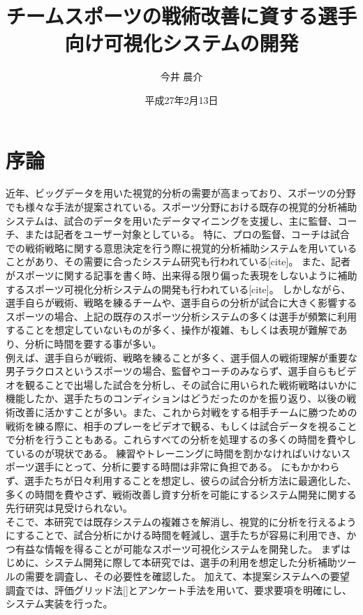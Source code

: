 \documentclass[sotsuron]{kuee}
\title{チームスポーツの戦術改善に資する選手向け可視化システムの開発}
\author{今井 晨介}
\date{平成27年2月13日}
\begin{document}
\maketitle	
\tableofcontents


\chapter{序論}
	近年、ビッグデータを用いた視覚的分析の需要が高まっており、スポーツの分野でも様々な手法が提案されている。スポーツ分野における既存の視覚的分析補助システムは、試合のデータを用いたデータマイニングを支援し、主に監督、コーチ、または記者をユーザー対象としている。
	特に、プロの監督、コーチは試合での戦術戦略に関する意思決定を行う際に視覚的分析補助システムを用いていることがあり、その需要に合ったシステム研究も行われている[cite]。
	また、記者がスポーツに関する記事を書く時、出来得る限り偏った表現をしないように補助するスポーツ可視化分析システムの開発も行われている[cite]。
	しかしながら、選手自らが戦術、戦略を練るチームや、選手自らの分析が試合に大きく影響するスポーツの場合、上記の既存のスポーツ分析システムの多くは選手が頻繁に利用することを想定していないものが多く、操作が複雑、もしくは表現が難解であり、分析に時間を要する事が多い。
	\\例えば、選手自らが戦術、戦略を練ることが多く、選手個人の戦術理解が重要な男子ラクロスというスポーツの場合、監督やコーチのみならず、選手自らもビデオを観ることで出場した試合を分析し、その試合に用いられた戦術戦略はいかに機能したか、選手たちのコンディションはどうだったのかを振り返り、以後の戦術改善に活かすことが多い。また、これから対戦をする相手チームに勝つための戦術を練る際に、相手のプレーをビデオで観る、もしくは試合データを視ることで分析を行うこともある。これらすべての分析を処理するの多くの時間を費やしているのが現状である。
	練習やトレーニングに時間を割かなければいけないスポーツ選手にとって、分析に要する時間は非常に負担である。
	にもかかわらず、選手たちが日々利用することを想定し、彼らの試合分析方法に最適化した、多くの時間を費やさず、戦術改善し資す分析を可能にするシステム開発に関する先行研究は見受けられない。
	\\そこで、本研究では既存システムの複雑さを解消し、視覚的に分析を行えるようにすることで、試合分析にかける時間を軽減し、選手たちが容易に利用でき、かつ有益な情報を得ることが可能なスポーツ可視化システムを開発した。
	まずはじめに、システム開発に際して本研究では、選手の利用を想定した分析補助ツールの需要を調査し、その必要性を確認した。
	加えて、本提案システムへの要望調査では、評価グリッド法[]とアンケート手法を用いて、要求要項を明確にし、システム実装を行った。
\end{document}
